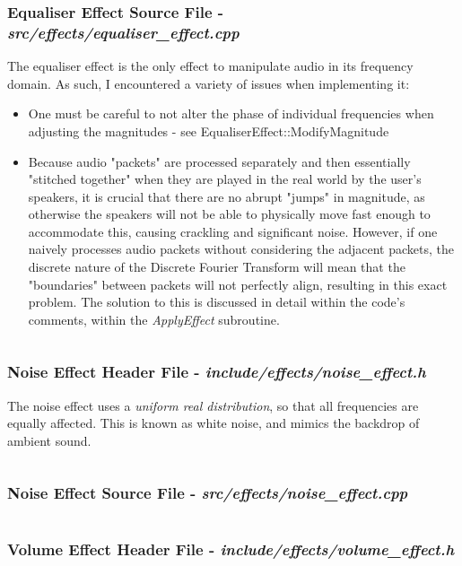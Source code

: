 \subsubsection{Equaliser Effect Source File - \textit{src/effects/equaliser\_effect.cpp}}
The equaliser effect is the only effect to manipulate audio in its frequency domain. As such, I encountered a variety of issues when implementing it:
\begin{itemize}
	\item One must be careful to not alter the phase of individual frequencies when adjusting the magnitudes - see EqualiserEffect::ModifyMagnitude
	\item Because audio "packets" are processed separately and then essentially "stitched together" when they are played in the real world by the user's speakers, it is crucial that there are no abrupt "jumps" in magnitude, as otherwise the speakers will not be able to physically move fast enough to accommodate this, causing crackling and significant noise. However, if one naively  processes audio packets without considering the adjacent packets, the discrete nature of the Discrete Fourier Transform will mean that the "boundaries" between packets will not perfectly align, resulting in this exact problem. The solution to this is discussed in detail within the code's comments, within the \textit{ApplyEffect} subroutine.
\end{itemize}
\inputminted[linenos]{c++}{../src/effects/equaliser_effect.cpp}

\pagebreak
\subsubsection{Noise Effect Header File - \textit{include/effects/noise\_effect.h}}
The noise effect uses a \textit{uniform real distribution}, so that all frequencies are equally affected. This is known as white noise, and mimics the backdrop of ambient sound. 
\inputminted[linenos]{c++}{../include/effects/noise_effect.h}
\pagebreak
\subsubsection{Noise Effect Source File - \textit{src/effects/noise\_effect.cpp}}
\inputminted[linenos]{c++}{../src/effects/noise_effect.cpp}

\pagebreak
\subsubsection{Volume Effect Header File - \textit{include/effects/volume\_effect.h}}
\inputminted[linenos]{c++}{../include/effects/volume_effect.h}
\pagebreak

